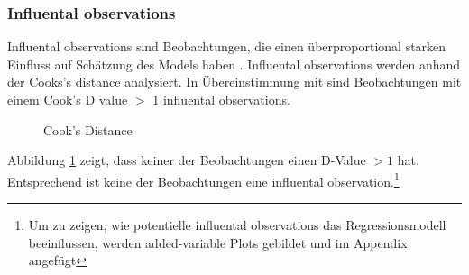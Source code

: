 \documentclass[11pt,a4paper]{article}
\begin{document}
\subsubsection{Influental observations}
Influental observations sind Beobachtungen, die einen überproportional starken Einfluss auf Schätzung des Models haben \parencite{kabacoff2015r}. Influental observations werden anhand der Cooks's distance analysiert. In Übereinstimmung mit \textcite{kabacoff2015r} sind Beobachtungen mit einem Cook's D value $>$ 1 influental observations. 

\begin{figure}[!htbp] 
\begin{center}
\caption{Cook's Distance}\label{fig:g}
\scalebox{0.5}{
}
\end{center}
\end{figure} 

Abbildung \ref{fig:g} zeigt, dass keiner der Beobachtungen einen D-Value $>1$ hat. Entsprechend ist keine der Beobachtungen eine influental observation.\footnote{Um zu zeigen, wie potentielle influental observations das Regressionsmodell beeinflussen, werden added-variable Plots gebildet und im Appendix angefügt}\\





\end{document}
